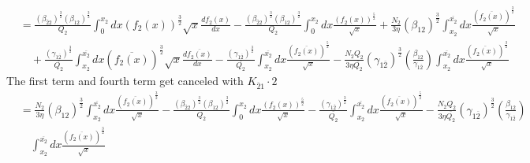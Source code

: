 \documentclass[fleqn, 10pt]{article}
\begin{document}
                \begin{equation*}
                \begin{split}
                &= \frac{(\beta_{\overline{2}2})^\frac{3}{2} (\beta_{12})^\frac{3}{2}}{Q_2} \int^{x_2}_0 dx (f_2(x))^\frac{3}{2} \sqrt{x} \frac{df_2(x)}{dx} - \frac{(\beta_{\overline{2}2})^\frac{3}{2} (\beta_{12})^\frac{3}{2}}{Q_2} \int^{x_2}_0 dx \frac{(f_2(x))^\frac{5}{2}}{\sqrt{x}} + \frac{N_2}{3 \eta} (\beta_{12})^\frac{3}{2} \int^{\overline{x_{2}}}_{x_2} dx \frac{(\overline{f_{2}(x)})^\frac{3}{2}}{\sqrt{x}} \\ & \quad + \frac{(\gamma_{1\overline{2}})^\frac{3}{2}}{\overline{Q_{2}}} \int^{\overline{x_{2}}}_{x_2} dx (\overline{f_{2}(x)})^\frac{3}{2} \sqrt{x} \frac{d\overline{f_{2}(x)}}{dx} - \frac{(\gamma_{1\overline{2}})^\frac{3}{2}}{\overline{Q_{2}}} \int^{\overline{x_{2}}}_{x_2} dx \frac{(\overline{f_{2}(x)})^\frac{5}{2}}{\sqrt{x}} - \frac{N_2 Q_2}{3 \eta \overline{Q_{2}}} (\gamma_{1\overline{2}})^\frac{3}{2} \left( \frac{\beta_{12}}{\gamma_{1\overline{2}}}\right)\int^{\overline{x_{2}}}_{x_2} dx \frac{(\overline{f_{2}(x)})^\frac{3}{2}}{\sqrt{x}}
                \end{split}
                \end{equation*}
                The first term and fourth term get canceled with $K_{\overline{2}1} \cdot 2$
                \begin{equation*}
                \begin{split}
                    & = \frac{N_2}{3 \eta} (\beta_{12})^\frac{3}{2} \int^{\overline{x_{2}}}_{x_2} dx \frac{(\overline{f_{2}(x)})^\frac{3}{2}}{\sqrt{x}} - \frac{(\beta_{\overline{2}2})^\frac{3}{2} (\beta_{12})^\frac{3}{2}}{Q_2} \int^{x_2}_0 dx \frac{(f_2(x))^\frac{5}{2}}{\sqrt{x}} - \frac{(\gamma_{1\overline{2}})^\frac{3}{2}}{\overline{Q_{2}}} \int^{\overline{x_{2}}}_{x_2} dx \frac{(\overline{f_{2}(x)})^\frac{5}{2}}{\sqrt{x}} - \frac{N_2 Q_2}{3 \eta \overline{Q_{2}}} (\gamma_{1\overline{2}})^\frac{3}{2} \left( \frac{\beta_{12}}{\gamma_{1\overline{2}}}\right) \\ & \quad \int^{\overline{x_{2}}}_{x_2} dx \frac{(\overline{f_{2}(x)})^\frac{3}{2}}{\sqrt{x}}
                    \end{split}
                \end{equation*}
\end{document}
